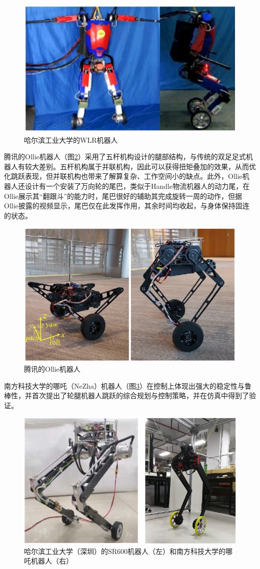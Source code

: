 \begin{figure}[h!]
  \centering
  \includegraphics[width=0.5\linewidth]{figures/Sec1/HITWRL.png}
  \caption{
  哈尔滨工业大学的WLR机器人\cite{li2018design}
  }
  \label{fig:sec1-HITWRL}
   \vspace{6pt}
\end{figure}

腾讯的Ollie机器人（图\ref{fig:sec1-Ollie}）采用了五杆机构设计的腿部结构，与传统的双足足式机器人有较大差别。五杆机构属于并联机构，因此可以获得扭矩叠加的效果，从而优化跳跃表现，但并联机构也带来了解算复杂、工作空间小的缺点。此外，Ollie机器人还设计有一个安装了万向轮的尾巴，类似于Handle物流机器人的动力尾，在Ollie展示其“翻跟斗”的能力时，尾巴很好的辅助其完成旋转一周的动作，但据Ollie披露的视频显示，尾巴仅在此发挥作用，其余时间均收起，与身体保持固连的状态。

\begin{figure}[h!]
  \centering
  \includegraphics[width=0.5\linewidth]{figures/Sec1/Ollie.png}
  \caption{
  腾讯的Ollie机器人\cite{wang2021balance}
  }
  \label{fig:sec1-Ollie}
   \vspace{6pt}
\end{figure}

南方科技大学的哪吒（NeZha）机器人（图\ref{fig:sec1-sr600nezha}）在控制上体现出强大的稳定性与鲁棒性，并首次提出了轮腿机器人跳跃的综合规划与控制策略\cite{chen2020underactuated}，并在仿真中得到了验证。

\begin{figure}[h!]
  \centering
  \includegraphics[width=0.5\linewidth]{figures/Sec1/sr600nezha.png}
  \caption{
  哈尔滨工业大学（深圳）的SR600机器人\cite{zhang2020sr600}（左）和南方科技大学的哪吒机器人（右）
  }
  \label{fig:sec1-sr600nezha}
   \vspace{6pt}
\end{figure}

